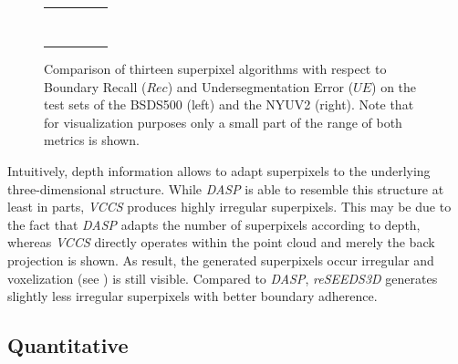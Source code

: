\documentclass[runningheads]{llncs}
\begin{document}
\begin{figure}[t]
\begin{tabularx}{\linewidth}{@{}Y@{}Y@{} | Y@{}Y@{}Y@{}}
{\begin{tikzpicture}
{					    \phantom{a}\\
					    \phantom{a}\\
					    \phantom{a}\\
					    \phantom{a}\\
					    \phantom{a}\\
					    \phantom{a}\\
					    \phantom{a}\\
				    };
		    \end{tikzpicture}
		}
	\end{tabularx}
	\vspace{-3mm}
	\caption{Comparison of thirteen superpixel algorithms with respect to Boundary Recall ($Rec$) and Undersegmentation Error ($UE$) on the test sets of the BSDS500 (left) and the NYUV2 (right).
	Note that for visualization purposes only a small part of the range of both metrics is shown.
	}
	\label{fig:quantitative}
\end{figure}
    
    Intuitively, depth information allows to adapt superpixels to the underlying three-dimensional structure. While \textit{DASP} is able to resemble this structure at least in parts, \textit{VCCS} produces highly irregular superpixels. This may be due to the fact that \textit{DASP} adapts the number of superpixels according to depth, whereas \textit{VCCS} directly operates within the point cloud and merely the back projection is shown. As result, the generated superpixels occur irregular and voxelization (see \cite{PaponAbramovSchoelerWoergoetter:2013}) is still visible.
    Compared to \textit{DASP}, \textit{reSEEDS3D} generates slightly less irregular superpixels with better boundary adherence.
    
    \vspace{-1.5mm}
    \subsection{Quantitative}
    \label{subsec:quantitative}
    \vspace{-0.5mm}
    
\end{document}
